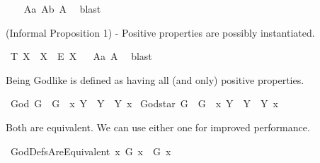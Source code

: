 \begin{isabellebody}
\ \ %
%
\isamarkupfalse%
\ A{}a\ A{}b\ A{}\ \isamarkupfalse%
\ blast\ %
%
%
%
%
\begin{isamarkuptext}%
(Informal Proposition 1) - Positive properties are possibly instantiated.%
\end{isamarkuptext}\isamarkuptrue%
\isamarkupfalse%
\ T{}{\isacharcolon}\ {\isachardoublequoteopen}{\isasymlfloor}\isactrlbold {\isasymforall}X{\isachardot}\ {\isasymP}\ X\ \isactrlbold {\isasymrightarrow}\ \isactrlbold {\isasymdiamond}\isactrlbold {\isasymexists}\isactrlsup E\ X{\isasymrfloor}{\isachardoublequoteclose}%
\ %
%
\isamarkupfalse%
\ A{}a\ A{}\ \isamarkupfalse%
\ blast%
%
%
%
\begin{isamarkuptext}%
Being Godlike is defined as having all (and only) positive properties.%
\end{isamarkuptext}\isamarkuptrue%
\isamarkupfalse%
\ God{\isacharcolon}{\isacharcolon}{\isachardoublequoteopen}{\isasymup}{\isasymlangle}{\isasymzero}{\isasymrangle}{\isachardoublequoteclose}\ {\isacharparenleft}{\isachardoublequoteopen}G{\isachardoublequoteclose}{\isacharparenright}\ \ {\isachardoublequoteopen}G\ {\isasymequiv}\ {\isacharparenleft}{\isasymlambda}x{\isachardot}\ \isactrlbold {\isasymforall}Y{\isachardot}\ {\isasymP}\ Y\ \isactrlbold {\isasymrightarrow}\ Y\ x{\isacharparenright}{\isachardoublequoteclose}\isanewline
{}\isamarkupfalse%
\ God{\isacharunderscore}star{\isacharcolon}{\isacharcolon}{\isachardoublequoteopen}{\isasymup}{\isasymlangle}{\isasymzero}{\isasymrangle}{\isachardoublequoteclose}\ {\isacharparenleft}{\isachardoublequoteopen}G{\isacharasterisk}{\isachardoublequoteclose}{\isacharparenright}\ \ {\isachardoublequoteopen}G{\isacharasterisk}\ {\isasymequiv}\ {\isacharparenleft}{\isasymlambda}x{\isachardot}\ \isactrlbold {\isasymforall}Y{\isachardot}\ {\isasymP}\ Y\ \isactrlbold {\isasymleftrightarrow}\ Y\ x{\isacharparenright}{\isachardoublequoteclose}%
\begin{isamarkuptext}%
Both are equivalent. We can use either one for improved performance.%
\end{isamarkuptext}\isamarkuptrue%
\isamarkupfalse%
\ GodDefsAreEquivalent{\isacharcolon}\ {\isachardoublequoteopen}{\isasymlfloor}\isactrlbold {\isasymforall}x{\isachardot}\ G\ x\ \isactrlbold {\isasymleftrightarrow}\ G{\isacharasterisk}\ x{\isasymrfloor}{\isachardoublequoteclose}%

\end{isabellebody}
